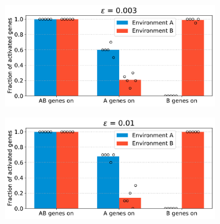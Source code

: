 \begin{figure}[H]
\centering
\begin{subfigure}[t]{0.49\textwidth}
\includegraphics[width=\textwidth]{alife/img/mean_activation_epsilon-0.003.pdf}
\label{subfig:alife:param_epsilon_1}
\end{subfigure}
\begin{subfigure}[t]{0.49\textwidth}
\includegraphics[width=\textwidth]{alife/img/mean_activation_epsilon-0.01.pdf}
\label{subfig:alife:param_epsilon_2}
\end{subfigure}


\end{figure}
